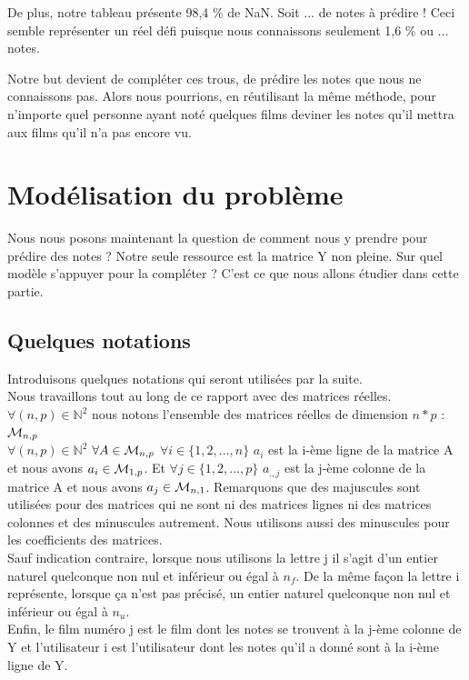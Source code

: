 \documentclass[a4paper,10pt]{article}
\begin{document}
De plus, notre tableau présente 98,4 \% de NaN. Soit ... de notes à prédire ! Ceci semble représenter un réel défi puisque nous connaissons seulement 1,6 \% ou ... notes.

Notre but devient de compléter ces trous, de prédire les notes que nous ne connaissons pas. Alors nous pourrions, en réutilisant la même méthode, pour n'importe quel personne ayant noté quelques films deviner les notes qu'il mettra aux films qu'il n'a pas encore vu.

\section{Modélisation du problème}

Nous nous posons maintenant la question de comment nous y prendre pour prédire des notes ?
Notre seule ressource est la matrice Y non pleine. Sur quel modèle s'appuyer pour la compléter ?
C'est ce que nous allons étudier dans cette partie.

\subsection{Quelques notations}

Introduisons quelques notations qui seront utilisées par la suite.\\

Nous travaillons tout au long de ce rapport avec des matrices réelles. $\forall (n, p) \in \mathbb{N}^2$ nous notons l'ensemble des matrices réelles de dimension $n * p$ : ${\cal M}_{n, p}$\\
$\forall (n, p) \in \mathbb{N}^2$ $\forall A \in {\cal M}_{n, p}$ $\forall i \in \{1, 2, ..., n\}$ $a_i$ est la i-ème ligne de la matrice A et nous avons $a_i \in {\cal M}_{1, p}$. Et $\forall j \in \{1, 2, ..., p\}$ $a_{., j}$ est la j-ème colonne de la matrice A et nous avons $a_j \in {\cal M}_{n, 1}$. Remarquons que des majuscules sont utilisées pour des matrices qui ne sont ni des matrices lignes ni des matrices colonnes et des minuscules autrement. Nous utilisons aussi des minuscules pour les coefficients des matrices.\\
Sauf indication contraire, lorsque nous utilisons la lettre j il s'agit d'un entier naturel quelconque non nul et inférieur ou égal à $n_f$. De la même façon la lettre i représente, lorsque ça n'est pas précisé, un entier naturel quelconque non nul et inférieur ou égal à $n_u$.\\
Enfin, le film numéro j est le film dont les notes se trouvent à la j-ème colonne de Y et l'utilisateur i est l'utilisateur dont les notes qu'il a donné sont à la i-ème ligne de Y.
\end{document}
